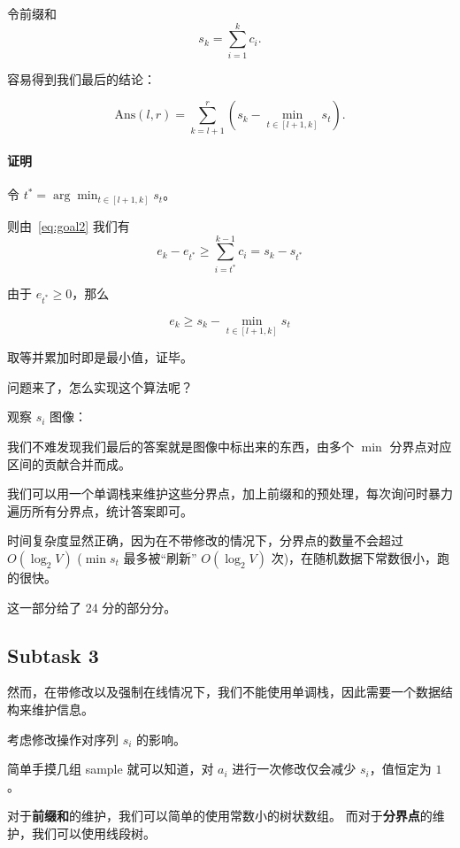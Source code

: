 \documentclass[14pt,a4paper]{article}
\begin{document}
令前缀和
\begin{equation}
    s_k = \sum_{i=1}^{k} c_i.
\end{equation}

容易得到我们最后的结论：

\begin{equation}
    \text{Ans}(l,r) = \sum_{k=l+1}^{r} (s_k - \min_{t \in [l+1, k]} s_t).
    \label{eq:ans}
\end{equation}

\paragraph{证明}

令 $t^* = \arg \min_{t\in[l+1,k]} s_t$。

则由~\eqref{eq:goal2} 我们有
\begin{equation}
    e_k - e_{t^*} \ge \sum_{i=t^*}^{k-1} c_i = s_k - s_{t^*}
\end{equation}

由于 $e_{t^*} \ge 0$，那么

\begin{equation}
    e_k \ge s_k - \min_{t\in[l+1,k]} s_t
\end{equation}

取等并累加时即是最小值，证毕。

问题来了，怎么实现这个算法呢？

观察 $s_i$ 图像：

我们不难发现我们最后的答案就是图像中标出来的东西，由多个 $\min$ 分界点对应区间的贡献合并而成。

我们可以用一个单调栈来维护这些分界点，加上前缀和的预处理，每次询问时暴力遍历所有分界点，统计答案即可。

时间复杂度显然正确，因为在不带修改的情况下，分界点的数量不会超过 $O(\log_2 V)$ ($\min s_t$ 最多被“刷新” $O(\log_2 V)$ 次)，在随机数据下常数很小，跑的很快。

这一部分给了 24 分的部分分。

\subsection{Subtask 3}
然而，在带修改以及强制在线情况下，我们不能使用单调栈，因此需要一个数据结构来维护信息。

考虑修改操作对序列 $s_i$ 的影响。

简单手摸几组 sample 就可以知道，对 $a_i$ 进行一次修改仅会减少 $s_i$，值恒定为 $1$。

对于\textbf{前缀和}的维护，我们可以简单的使用常数小的树状数组。
而对于\textbf{分界点}的维护，我们可以使用线段树。
\end{document}
